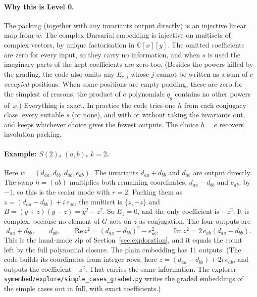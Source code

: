 \documentclass[11pt]{article}
\theoremstyle{definition}
\theoremstyle{remark}
\begin{document}
\paragraph{Why this is Level 0.}
The packing (together with any invariants output directly) is an injective
linear map from $w$. The complex Bursarial embedding is injective on multisets
of complex vectors, by unique factorisation in $\mathbb{C}[x][y]$. The omitted
coefficients are zero for every input, so they carry no information, and when
$s$ is used the imaginary parts of the kept coefficients are zero too. (Besides
the powers killed by the grading, the code also omits any $E_{c,j}$ whose $j$
cannot be written as a sum of $c$ \emph{occupied} positions. When some positions
are empty padding, these are zero for the simplest of reasons: the product of
$c$ polynomials $q_g$ contains no other powers of~$x$.)
Everything is exact. In practice the code tries one $h$ from each conjugacy
class, every suitable $s$ (or none), and with or without taking the invariants
out, and keeps whichever choice gives the fewest outputs. The choice $h = e$
recovers involution packing.

\paragraph{Example: $S(2)$, $(a, b)$, $k = 2$.}
Here $w = (d_{aa}, d_{bb}, d_{ab}, e_{ab})$. The invariants $d_{aa} + d_{bb}$ and
$d_{ab}$ are output directly. The swap $h = (ab)$ multiplies both remaining
coordinates, $d_{aa} - d_{bb}$ and $e_{ab}$, by $-1$, so this is the scalar mode
with $r = 2$. Packing them as $z = (d_{aa} - d_{bb}) + i\, e_{ab}$, the multiset is
$\{z, -z\}$ and $B = (y + z)(y - z) = y^2 - z^2$. So $E_1 = 0$, and the only
coefficient is $-z^2$. It is complex, because no element of $G$ acts on $z$ as
conjugation. The four outputs are
\[
  d_{aa} + d_{bb}, \qquad d_{ab}, \qquad
  \mathrm{Re}\, z^2 = (d_{aa} - d_{bb})^2 - e_{ab}^2, \qquad
  \mathrm{Im}\, z^2 = 2\, e_{ab} (d_{aa} - d_{bb}) .
\]
This is the hand-made zip of Section~\ref{sec:exploration}, and it equals the
count left by the full polynomial closure. The plain embedding has 11 outputs.
(The code builds its coordinates from integer rows, here
$z = (d_{aa} - d_{bb}) + 2i\,e_{ab}$, and outputs the coefficient $-z^2$. That
carries the same information. The explorer
\texttt{symembed/explore/simple\_cases\_graded.py} writes the graded embeddings
of the simple cases out in full, with exact coefficients.)
\end{document}

